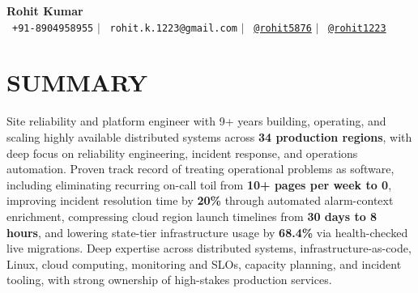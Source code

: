 \documentclass[letterpaper,11pt]{article}
\begin{document}
\begin{center}
    \textbf{\Huge Rohit Kumar} \\ \vspace{5pt}
    \small \faPhone*\ \texttt{+91-8904958955} \hspace{1pt} $|$
    \hspace{1pt} \faEnvelope\ \texttt{rohit.k.1223@gmail.com} \hspace{1pt} $|$
    \hspace{1pt} \faLinkedin\ \href{https://www.linkedin.com/in/rohit5876}{\texttt{@rohit5876}} \hspace{1pt} $|$
    \hspace{1pt} \faGithub\ \href{https://github.com/rohit1223}{\texttt{@rohit1223}} \hspace{1pt} \\ \vspace{-3pt}
\end{center}

\section{SUMMARY}
\begin{itemize}[leftmargin=0in, label={}]
    \small{\item{Site reliability and platform engineer with 9+ years building, operating, and scaling highly available distributed systems across \textbf{34 production regions}, with deep focus on reliability engineering, incident response, and operations automation. Proven track record of treating operational problems as software, including eliminating recurring on-call toil from \textbf{10+ pages per week to 0}, improving incident resolution time by \textbf{20\%} through automated alarm-context enrichment, compressing cloud region launch timelines from \textbf{30 days to 8 hours}, and lowering state-tier infrastructure usage by \textbf{68.4\%} via health-checked live migrations. Deep expertise across distributed systems, infrastructure-as-code, Linux, cloud computing, monitoring and SLOs, capacity planning, and incident tooling, with strong ownership of high-stakes production services.}}
\end{itemize}

\end{document}
